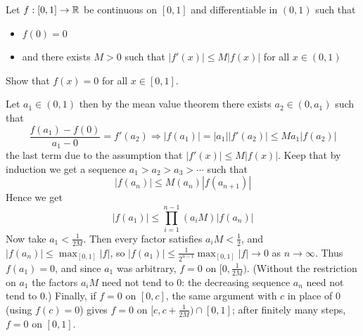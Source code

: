 \begin{problem}
Let $f:[0,1]\to \mathbb{R}$ be continuous on $[0,1]$ and differentiable in $(0,1)$ such that \begin{itemize}
        \item $f(0)=0$
        \item and there exists $M>0$ such that $|f'(x)|\leq M |f(x)|$ for all $x\in (0,1)$
    \end{itemize}
    Show that $f(x)=0$ for all $x\in [0,1]$.
\begin{solution}
Let $a_1 \in (0,1)$ then by the mean value theorem there exists $a_2 \in (0,a_1)$ such that 
    \[\frac{f(a_1)-f(0)}{a_1-0} = f'(a_2)\Rightarrow |f(a_1)| = |a_1||f'(a_2)| \leq Ma_1 |f(a_2)|\]
    the last term due to the assumption that $|f'(x)|\leq M |f(x)|$. Keep that by induction we get a sequence $a_1 > a_2 > a_3 >\cdots $ such that $$|f(a_n)| \leq M(a_{n})|f(a_{n+1})| $$
    Hence we get 
    $$|f(a_1)| \leq \prod_{i=1}^{n-1} (a_i M) |f(a_n)|$$ Now take $a_1 < \frac{1}{2M}$. Then every factor satisfies $a_iM < \frac12$, and $|f(a_n)|\leq \max_{[0,1]}|f|$, so $|f(a_1)|\leq \frac{1}{2^{n-1}}\max_{[0,1]}|f| \to 0$ as $n\to \infty$. Thus $f(a_1)=0$, and since $a_1$ was arbitrary, $f=0$ on $[0,\frac{1}{2M})$. (Without the restriction on $a_1$ the factors $a_iM$ need not tend to $0$: the decreasing sequence $a_n$ need not tend to $0$.) Finally, if $f=0$ on $[0,c]$, the same argument with $c$ in place of $0$ (using $f(c)=0$) gives $f=0$ on $[c,c+\frac{1}{2M})\cap[0,1]$; after finitely many steps, $f=0$ on $[0,1]$.
\end{solution}
\end{problem}

